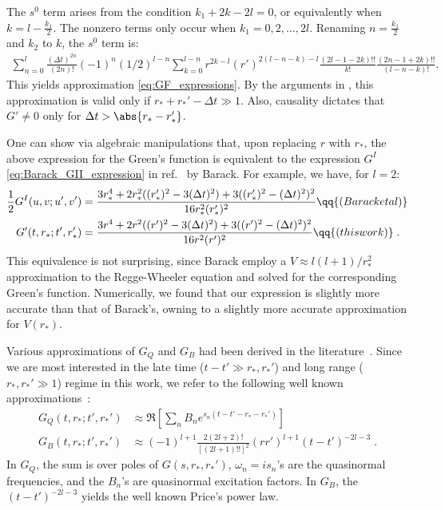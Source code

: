 The \( s^0 \) term arises from the condition \( k_1 + 2k - 2l = 0 \), or equivalently when \( k = l - \frac{k_1}{2} \).
The nonzero terms only occur when \( k_1 = 0, 2, \dots, 2l \).
Renaming \( n = \frac{k_1}{2} \) and $k_2$ to $k$, the \( s^0 \) term is:
\begin{align}
  \sum_{n=0}^{l} \frac{(\Delta{t})^{2n}}{(2n)!} (-1)^n (1/2)^{l-n}
  \sum_{k=0}^{l-n} r^{2k - l} (r')^{2(l-n-k) - l} \frac{ (2l-1-2k)!! }{k!}
  \frac{ (2n-1+2k)!! }{(l-n-k)!}.
\end{align}
This yields approximation \eqref{eq:GF_expressions}.
By the arguments in , this approximation is valid only if $r_* + r_*' - \Delta{t} \gg 1$.
Also, causality dictates that $G' \neq 0$ only for $\Delta{t} > \abs{r_* - r_*'}$.


One can show via algebraic manipulations that, upon replacing $r$ with $r_*$, the above expression for the Green's function is equivalent to the expression $G^{I}$ \eqref{eq:Barack_GII_expression} in ref.~\cite{Barack:1998bw} by Barack.
For example, we have, for $l=2$:
\begin{align}
  \frac12 G^{I}(u,v;u',v') &= \frac{3 r_*^4 + 2 r_*^2 ((r_*')^2 - 3 (\Delta{t})^2) + 3 ((r_*')^2 - (\Delta{t})^2)^2}{16 r_*^2 (r_*')^2} \qq{(Barack et al)} \nonumber \\
  G'(t,r_*;t',r_*') &=   \frac{3 r^4 + 2 r^2 ((r')^2 - 3 (\Delta{t})^2) + 3 ((r')^2 - (\Delta{t})^2)^2}{16 r^2 (r')^2} \qq{(this work)} \;.
\end{align}
This equivalence is not surprising, since Barack employ a $V \approx l(l+1)/r_*^2$ approximation to the Regge-Wheeler equation and solved for the corresponding Green's function.
Numerically, we found that our expression is slightly more accurate than that of Barack's, owning to a slightly more accurate approximation for $V(r_*)$.




\label{sec:GQ_and_GB}
Various approximations of $G_Q$ and $G_B$ had been derived in the literature~\cite{Leaver:1986gd,Andersson:1996cm}.
Since we are most interested in the late time ($t-t' \gg r_*,r_*'$) and long range ($r_*, r_*' \gg 1$) regime in this work, we refer to the following well known approximations~\cite{Leaver:1986gd,Berti:2006wq}:
\begin{align}
  \label{eq:GQ_GB_expressions}
  G_Q(t,r_*;t',r_*') &\approx \Re \left[ \sum_n B_n e^{s_n (t-t'-r_*-r_*')} \right]
    \nonumber \\
  G_B(t,r_*;t',r_*') &\approx (-1)^{l+1} \frac{2(2l+2)!}{[(2l+1)!!]^2} (rr')^{l+1} (t-t')^{-2l-3} \;.
\end{align}
In $G_Q$, the sum is over poles of $G(s,r_*,r_*')$, $\omega_n = i s_n$'s are the quasinormal frequencies, and the $B_n$'s are quasinormal excitation factors. In $G_B$, the $(t-t')^{-2l-3}$ yields the well known Price's power law.




